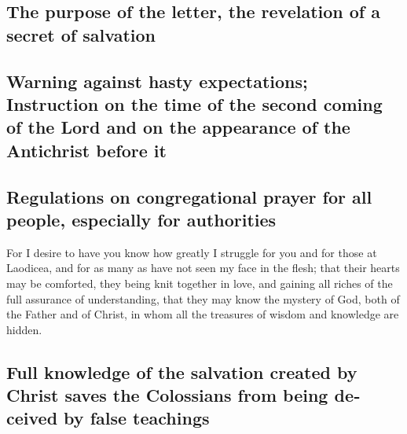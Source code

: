 \begin{paracol}{2}
\begin{otherlanguage}{english}
\hypertarget{the-purpose-of-the-letter-the-revelation-of-a-secret-of-salvation}{%
\subsection{The purpose of the letter, the revelation of a secret of
salvation}\label{the-purpose-of-the-letter-the-revelation-of-a-secret-of-salvation}}

\hypertarget{warning-against-hasty-expectations-instruction-on-the-time-of-the-second-coming-of-the-lord-and-on-the-appearance-of-the-antichrist-before-it}{%
\subsection{Warning against hasty expectations; Instruction on the time
of the second coming of the Lord and on the appearance of the Antichrist
before
it}\label{warning-against-hasty-expectations-instruction-on-the-time-of-the-second-coming-of-the-lord-and-on-the-appearance-of-the-antichrist-before-it}}

\hypertarget{regulations-on-congregational-prayer-for-all-people-especially-for-authorities}{%
\subsection{Regulations on congregational prayer for all people,
especially for
authorities}\label{regulations-on-congregational-prayer-for-all-people-especially-for-authorities}}

 For I desire to have you know how greatly I struggle for
you and for those at Laodicea, and for as many as have not seen my face
in the flesh;  that their hearts may be comforted, they
being knit together in love, and gaining all riches of the full
assurance of understanding, that they may know the mystery of God, both
of the Father and of Christ,  in whom all the treasures of
wisdom and knowledge are hidden.

\hypertarget{full-knowledge-of-the-salvation-created-by-christ-saves-the-colossians-from-being-deceived-by-false-teachings}{%
\subsection{Full knowledge of the salvation created by Christ saves the
Colossians from being deceived by false
teachings}\label{full-knowledge-of-the-salvation-created-by-christ-saves-the-colossians-from-being-deceived-by-false-teachings}}


\end{otherlanguage}
\end{paracol}
